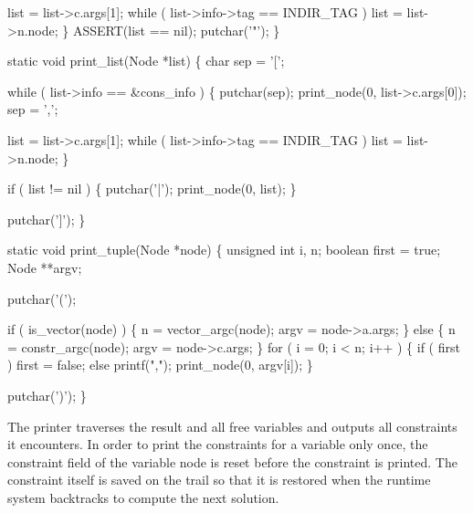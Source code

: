         list = list->c.args[1];
        while ( list->info->tag == INDIR_TAG )
            list = list->n.node;
   \}
   ASSERT(list == nil);
   putchar('"');
\}

static void
print_list(Node *list)
\{
    char sep = '[';

    while ( list->info == &cons_info )
    \{
        putchar(sep);
        print_node(0, list->c.args[0]);
        sep = ',';

        list = list->c.args[1];
        while ( list->info->tag == INDIR_TAG )
            list = list->n.node;
    \}

    if ( list != nil )
    \{
        putchar('|');
        print_node(0, list);
    \}

    putchar(']');
\}

static void
print_tuple(Node *node)
\{
    unsigned int i, n;
    boolean      first = true;
    Node         **argv;

    putchar('(');

    if ( is_vector(node) )
    \{
        n    = vector_argc(node);
        argv = node->a.args;
    \}
    else
    \{
        n    = constr_argc(node);
        argv = node->c.args;
    \}
    for ( i = 0; i < n; i++ )
    \{
        if ( first )
            first = false;
        else
            printf(",");
        print_node(0, argv[i]);
    \}

    putchar(')');
\}

\nwendcode{}\nwdocspar
The printer traverses the result and all free variables and outputs
all constraints it encounters. In order to print the constraints for a
variable only once, the constraint field of the variable node is reset
before the constraint is printed. The constraint itself is saved on
the trail so that it is restored when the runtime system backtracks to
compute the next solution.

